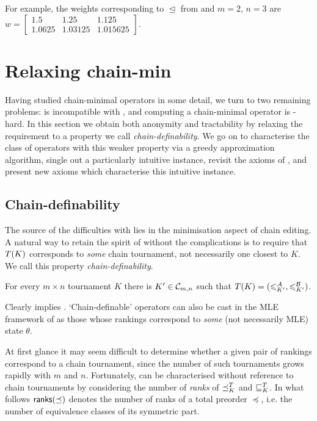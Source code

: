 For example, the weights corresponding to $\trianglelefteq$ from
 and $m = 2$, $n = 3$ are
$
    w = \left[\begin{smallmatrix}
        1.5 & 1.25 & 1.125 \\
        1.0625 & 1.03125 & 1.015625
    \end{smallmatrix}\right]
$.

\section{Relaxing chain-min}
\label{tourn_sec_relaxing_chain_min}

Having studied chain-minimal operators in some detail, we turn to two remaining
problems: \chainmin{} is incompatible with \anon{}, and
computing a chain-minimal operator is -hard. In this
section we obtain both anonymity and tractability by relaxing the
\chainmin{} requirement to a property we call
\emph{chain-definability}. We go on to characterise the class of operators with
this weaker property via a greedy approximation algorithm, single out a
particularly intuitive instance, revisit the axioms of
, and present new axioms which characterise
this intuitive instance.

\subsection{Chain-definability}

The source of the difficulties with \chainmin{} lies in the
minimisation aspect of chain editing. A natural way to retain the spirit of
\chainmin{} without the complications is to require that $T(K)$
corresponds to \emph{some} chain tournament, not necessarily one closest to
$K$. We call this property \emph{chain-definability}.

\begin{axiom}[\chaindef{}]
    For every $m \times n$ tournament $K$ there is $K' \in \mathcal{C}_{m,n}$ such that
    $T(K) = ({\leqslant^{\mathcal{A}}_{K'}}, {\leqslant^{\mathcal{B}}_{K'}})$.
\end{axiom}

Clearly \chainmin{} implies \chaindef{}. `Chain-definable'
operators can also be cast in the MLE framework of  as those
whose rankings correspond to \emph{some} (not necessarily MLE) state $\theta$.

At first glance it may seem difficult to determine whether a given pair of
rankings correspond to a chain tournament, since the number of such tournaments
grows rapidly with $m$ and $n$.
%
Fortunately, \chaindef{} can be characterised without reference to
chain tournaments by considering the number of \emph{ranks} of ${\preceq_K^T}$
and ${\sqsubseteq_K^T}$. In what follows $\mathsf{ranks}({\preceq})$ denotes the number of
ranks of a total preorder $\preceq$, i.e. the number of equivalence classes of
its symmetric part.

